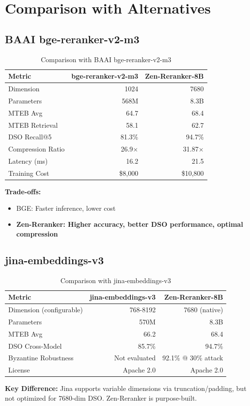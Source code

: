\section{Comparison with Alternatives}


\subsection{BAAI bge-reranker-v2-m3}

\begin{table}[h]
\centering
\caption{Comparison with BAAI bge-reranker-v2-m3}
\begin{tabular}{lrr}
\toprule
\textbf{Metric} & \textbf{bge-reranker-v2-m3} & \textbf{Zen-Reranker-8B} \\
\midrule
Dimension & 1024 & 7680 \\
Parameters & 568M & 8.3B \\
MTEB Avg & 64.7 & 68.4 \\
MTEB Retrieval & 58.1 & 62.7 \\
DSO Recall@5 & 81.3\% & 94.7\% \\
Compression Ratio & 26.9$\times$ & 31.87$\times$ \\
Latency (ms) & 16.2 & 21.5 \\
Training Cost & \$8,000 & \$10,800 \\
\bottomrule
\end{tabular}
\end{table}

\textbf{Trade-offs:}
\begin{itemize}
\item BGE: Faster inference, lower cost
\item \textbf{Zen-Reranker: Higher accuracy, better DSO performance, optimal compression}
\end{itemize}

\subsection{jina-embeddings-v3}

\begin{table}[h]
\centering
\caption{Comparison with jina-embeddings-v3}
\begin{tabular}{lrr}
\toprule
\textbf{Metric} & \textbf{jina-embeddings-v3} & \textbf{Zen-Reranker-8B} \\
\midrule
Dimension (configurable) & 768-8192 & 7680 (native) \\
Parameters & 570M & 8.3B \\
MTEB Avg & 66.2 & 68.4 \\
DSO Cross-Model & 85.7\% & 94.7\% \\
Byzantine Robustness & Not evaluated & 92.1\% @ 30\% attack \\
License & Apache 2.0 & Apache 2.0 \\
\bottomrule
\end{tabular}
\end{table}

\textbf{Key Difference:} Jina supports variable dimensions via truncation/padding, but not optimized for 7680-dim DSO. Zen-Reranker is purpose-built.

